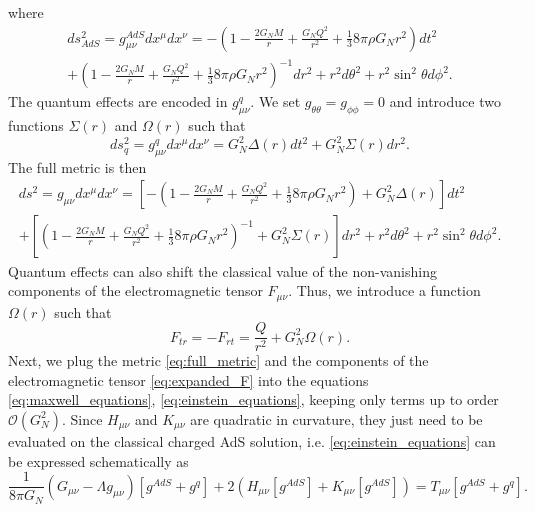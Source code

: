\documentclass[10pt,a4paper]{article}
\begin{document}
where
\begin{equation}
\begin{gathered}
    ds^2_{AdS}=g^{AdS}_{\mu\nu}dx^{\mu}dx^{\nu}=-\left(1-\frac{2G_N M}{r}+\frac{G_N Q^2}{r^2}+\frac{1}{3}8\pi\rho G_N r^2\right)dt^2\\
    +\left(1-\frac{2G_N M}{r}+\frac{G_N Q^2}{r^2}+\frac{1}{3}8\pi\rho G_N r^2\right)^{-1}dr^2+
    r^2d\theta^2+r^2\sin^2\theta d\phi^2.
\end{gathered}
\end{equation}
The quantum effects are encoded in $g^q_{\mu\nu}$. We set $g_{\theta\theta}=g_{\phi\phi}=0$ and introduce two functions $\Sigma(r)$ and $\Omega(r)$ such that
\begin{equation}\label{eq:quantum_metric}
    ds^2_{q}=g^{q}_{\mu\nu}dx^{\mu}dx^{\nu}=G^2_N\Delta(r)dt^2+G^2_N\Sigma(r)dr^2.
\end{equation}
The full metric is then
\begin{equation}\label{eq:full_metric}
\begin{gathered}
    ds^2=g_{\mu\nu}dx^{\mu}dx^{\nu}=\left[-\left(1-\frac{2G_N M}{r}+\frac{G_N Q^2}{r^2}+\frac{1}{3}8\pi\rho G_N r^2\right)+G^2_N\Delta(r)\right]dt^2\\
    +\left[\left(1-\frac{2G_N M}{r}+\frac{G_N Q^2}{r^2}+\frac{1}{3}8\pi\rho G_N r^2\right)^{-1}+G^2_N\Sigma(r)\right]dr^2+
    r^2d\theta^2+r^2\sin^2\theta d\phi^2.
\end{gathered}
\end{equation}
Quantum effects can also shift the classical value of the non-vanishing components of the electromagnetic tensor $F_{\mu\nu}$. Thus, we introduce a function $\Omega(r)$ such that
\begin{equation}\label{eq:expanded_F}
    F_{tr}=-F_{rt}=\frac{Q}{r^2}+G^2_N\Omega(r).
\end{equation}
Next, we plug the metric \eqref{eq:full_metric} and the components of the electromagnetic tensor \eqref{eq:expanded_F} into the equations \eqref{eq:maxwell_equations}, \eqref{eq:einstein_equations}, keeping only terms up to order $\mathcal{O}\left(G^2_N\right)$.
Since $H_{\mu\nu}$ and $K_{\mu\nu}$ are quadratic in curvature, they just need to be evaluated on the classical charged AdS solution, i.e. \eqref{eq:einstein_equations} can be expressed schematically as
\begin{equation}\label{eq:einstein_quantum}
\frac{1}{8\pi G_N}\left(G_{\mu\nu}-\Lambda g_{\mu\nu}\right)\left[g^{AdS}+g^{q}\right]+2 \left(H_{\mu\nu}\left[g^{AdS}\right]+K_{\mu\nu}\left[g^{AdS}\right]\right)=T_{\mu\nu}\left[g^{AdS}+g^{q}\right].
\end{equation}
\end{document}
